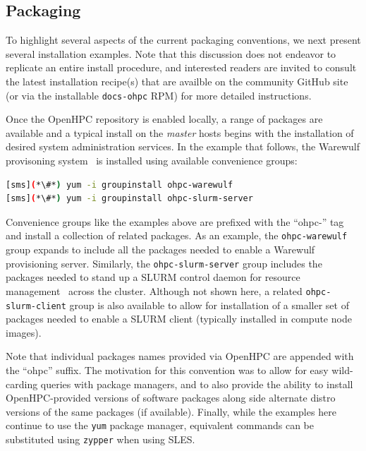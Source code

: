 \documentclass{sig-alternate-05-2015}
\begin{document}

\subsection{Packaging} \label{sec:packaging}

To highlight several aspects of the current packaging conventions, we next
present several installation examples. Note that this
discussion does not endeavor to replicate an entire install procedure, and
interested readers are invited to consult the latest installation recipe(s) that
are availble on the community GitHub site (or via the installable
\texttt{docs-ohpc} RPM) for more detailed instructions.

Once the OpenHPC repository is enabled locally, a range of packages are
available and a typical install on the {\em master} hosts begins with the
installation of desired system administration services. In the example that
follows, the Warewulf provisoning system~\cite{warewulf_url} is installed using
available convenience groups:

\begin{lstlisting}[language=bash,keywords={}]
[sms](*\#*) yum -i groupinstall ohpc-warewulf
[sms](*\#*) yum -i groupinstall ohpc-slurm-server
\end{lstlisting}
  
Convenience groups like the examples above are prefixed with the ``ohpc-'' tag
and install a collection of related packages. As an example, the
\texttt{ohpc-warewulf} group expands to include all the packages needed to
enable a Warewulf provisioning server. Similarly, the
\texttt{ohpc-slurm-server} group includes the packages needed to stand up a
SLURM control daemon for resource management~\cite{Jette02slurm:simple} across
the cluster.  Although not shown here, a related \texttt{ohpc-slurm-client}
group is also available to allow for installation of a smaller set of packages
needed to enable a SLURM client (typically installed in compute node images).

Note that individual packages names provided via OpenHPC are appended with the
``ohpc'' suffix.
The motivation for this convention was to  allow for easy wild-carding queries with package managers, and
to also provide the ability to install OpenHPC-provided versions of software packages
along side alternate distro versions of the same packages (if available).
Finally, while the examples here continue to use the \texttt{yum} package
manager, equivalent commands can be substituted using \texttt{zypper} when
using SLES.  \\
\end{document}
